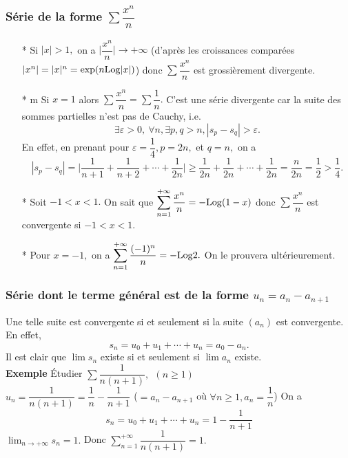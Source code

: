 \documentclass[11pt, a4paper]{book}
\begin{document}
\subsubsection{S\'erie de la forme $\sum \dfrac{x^{n}}{n}$}
\begin{itemize}
\item[*] Si $| x|>1,$ on a $\Big| \dfrac{x^{n}}{n} \Big| \rightarrow +\infty$ (d'apr\`es les croissances compar\'ees $| x^{n}|=| x|^{n}=\exp (n \mathrm{Log} | x|)$) donc $\sum \dfrac{x^{n}}{n}$ est grossi\`erement divergente.
\item[*]m Si $x=1$ alors $\sum \dfrac{x^{n}}{n}=\sum \dfrac{1}{n}.$ C'est une s\'erie divergente car la suite des sommes partielles n'est pas de Cauchy, i.e. $$\exists \varepsilon>0,~\forall n, \exists p,q >n, | s_{p}-s_{q}| >\varepsilon.$$
En effet, en prenant pour $\varepsilon=\dfrac{1}{4}, p=2n,$ et $q=n,$ on a $$|s_{p}-s_{q}|=\Big|\frac{1}{n+1}+\frac{1}{n+2}+\cdots+\frac{1}{2n}\Big| \geq \frac{1}{2n}+\frac{1}{2n}+\cdots + \frac{1}{2n}=\frac{n}{2n}=\frac{1}{2}>\frac{1}{4}.$$
\item[*] Soit $-1<x<1.$ On sait que ${\displaystyle \sum_{n=1}^{+\infty}\dfrac{x^{n}}{n}=-\mathrm{Log}(1-x)}$ donc $\sum \dfrac{x^{n}}{n}$ est convergente si $-1<x<1.$
\item[*] Pour $x=-1,$ on a ${\displaystyle \sum_{n=1}^{+\infty}\frac{(-1)^{n}}{n}=-\mathrm{Log}2}.$ On le prouvera ult\'erieurement.
\end{itemize}

\subsubsection{S\'erie dont le terme g\'en\'eral est de la forme $u_{n}=a_{n}-a_{n+1}$}
Une telle suite est convergente si et seulement si la suite $(a_{n})$ est convergente. En effet, $$s_{n}=u_{0}+u_{1}+\cdots+u_{n}=a_{0}-a_{n}.$$
Il est clair que $\lim s_{n}$ existe si et seulement si $\lim a_{n}$ existe.\\
\textbf{Exemple}\quad
\'Etudier $\sum \dfrac{1}{n(n+1)},~~(n\geq1)$\\
$u_{n}=\dfrac{1}{n(n+1)}=\dfrac{1}{n}-\dfrac{1}{n+1}$ ($=a_{n}-a_{n+1}$ o\`u $\forall n\geq1, a_{n}=\dfrac{1}{n}$)
On a $$s_{n}=u_{0}+u_{1}+\cdots+u_{n}=1-\frac{1}{n+1}$$
${\displaystyle \lim_{n\rightarrow +\infty}s_{n}=1}.$ Donc ${\displaystyle \sum_{n=1}^{+\infty}\dfrac{1}{n(n+1)}=1}.$
\end{document}
